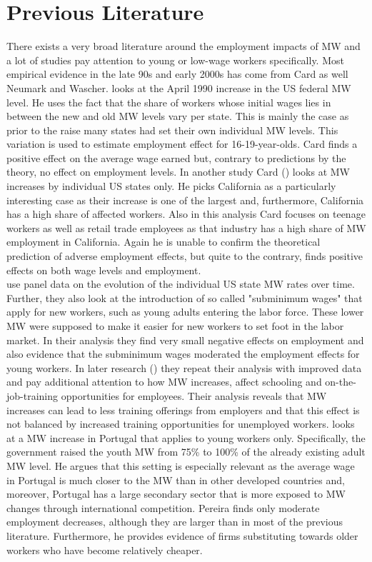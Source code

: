 \documentclass[11pt]{scrartcl}
\begin{document}
\section{Previous Literature}
There exists a very broad literature around the employment impacts of MW and a lot of studies pay attention to young or low-wage workers specifically. Most empirical evidence in the late 90s and early 2000s has come from Card as well Neumark and Wascher. \textcite{CardMWVariation1992} looks at the April 1990 increase in the US federal MW level. He uses the fact that the share of workers whose initial wages lies in between the new and old MW levels vary per state. This is mainly the case as prior to the raise many states had set their own individual MW levels. This variation is used to estimate employment effect for 16-19-year-olds. Card finds a positive effect on the average wage earned but, contrary to predictions by the theory, no effect on employment levels. In another study Card (\citeyear{CardMW1992}) looks at MW increases by individual US states only. He picks California as a particularly interesting case as their increase is one of the largest and, furthermore, California has a high share of affected workers. Also in this analysis Card focuses on teenage workers as well as retail trade employees as that industry has a high share of MW employment in California. Again he is unable to confirm the theoretical prediction of adverse employment effects, but quite to the contrary, finds positive effects on both wage levels and employment. \\

\textcite{NeumarkWascherMW1992} use panel data on the evolution of the individual US state MW rates over time. Further, they also look at the introduction of so called "subminimum wages" that apply for new workers, such as young adults entering the labor force. These lower MW were supposed to make it easier for new workers to set foot in the labor market. In their analysis they find very small negative effects on employment and also evidence that the subminimum wages moderated the employment effects for young workers. In later research (\cite{NeumarkWascherMW2001}) they repeat their analysis with improved data and pay additional attention to how MW increases, affect schooling and on-the-job-training opportunities for employees. Their analysis reveals that MW increases can lead to less training offerings from employers and that this effect is not balanced by increased training opportunities for unemployed workers. \textcite{PereiraMWPortugal2003} looks at a MW increase in Portugal that applies to young workers only. Specifically, the government raised the youth MW from 75\% to 100\% of the already existing adult MW level. He argues that this setting is especially relevant as the average wage in Portugal is much closer to the MW than in other developed countries and, moreover, Portugal has a large secondary sector that is more exposed to MW changes through international competition. Pereira finds only moderate employment decreases, although they are larger than in most of the previous literature. Furthermore, he provides evidence of firms substituting towards older workers who have become relatively cheaper.\\
\end{document}
